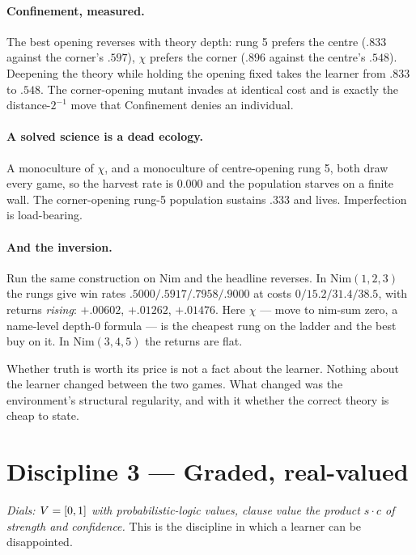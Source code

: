 \paragraph{Confinement, measured.} The best opening reverses with theory depth:
rung 5 prefers the centre ($.833$ against the corner's $.597$), $\chi$ prefers the
corner ($.896$ against the centre's $.548$). Deepening the theory while holding the
opening fixed takes the learner from $.833$ to $.548$. The corner-opening mutant
invades at identical cost and is exactly the distance-$2^{-1}$ move that
Confinement denies an individual.

\paragraph{A solved science is a dead ecology.} A monoculture of $\chi$, and a
monoculture of centre-opening rung 5, both draw every game, so the harvest rate is
$0.000$ and the population starves on a finite wall. The corner-opening rung-5
population sustains $.333$ and lives. Imperfection is load-bearing.

\paragraph{And the inversion.} Run the same construction on Nim \cite{ComposeNote}
and the headline reverses. In $\mathrm{Nim}(1,2,3)$ the rungs give win rates
$.5000/.5917/.7958/.9000$ at costs $0/15.2/31.4/38.5$, with returns
\emph{rising}: $+.00602$, $+.01262$, $+.01476$. Here $\chi$ --- move to nim-sum
zero, a name-level depth-$0$ formula --- is the cheapest rung on the ladder and
the best buy on it. In $\mathrm{Nim}(3,4,5)$ the returns are flat.

\begin{observation}
\label{obs:afford}
Whether truth is worth its price is not a fact about the learner. Nothing about
the learner changed between the two games. What changed was the environment's
structural regularity, and with it whether the correct theory is cheap to state.
\end{observation}

\section{Discipline 3 --- Graded, real-valued}
\label{sec:d3}

\emph{Dials: $V = [0,1]$ with probabilistic-logic values, clause value the
product $s \cdot c$ of strength and confidence.} This is the discipline in which
a learner can be disappointed.

